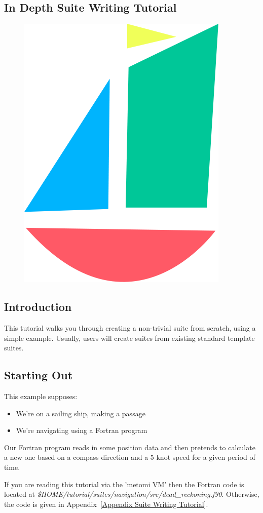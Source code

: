 
\begin{shaded*}
\section{In Depth Suite Writing Tutorial}
\label{In Depth Suite Writing Tutorial}
\end{shaded*}

\begin{figure}[htp]
\includegraphics[width=0.3\columnwidth]{resources/suite-writing.png}
\end{figure}

\subsection{Introduction}

This tutorial walks you through creating a non-trivial suite from scratch, using a simple example. Usually, users will create suites from existing standard template suites.

\subsection{Starting Out}

This example supposes:
\begin{itemize}
    \item We're on a sailing ship, making a passage
    \item We're navigating using a Fortran program
\end{itemize}

Our Fortran program reads in some position data and then pretends to calculate a new one based on a compass direction and a 5 knot speed for a given period of time.

If you are reading this tutorial via the 'metomi VM' then the Fortran code is located at {\em \$HOME/tutorial/suites/navigation/src/dead\_reckoning.f90}. Otherwise, the code is given in Appendix~\ref{Appendix Suite Writing Tutorial}.


